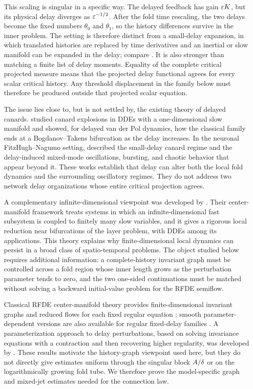 This scaling is singular in a specific way.  The delayed feedback has gain
\(\varepsilon K\), but its physical delay diverges as
\(\varepsilon^{-1/2}\).  After the fold time rescaling, the two delays become the
fixed numbers \(\theta_0\) and \(\theta_1\), so the history differences
survive in the inner problem.  The setting is therefore distinct from a
small-delay expansion, in which translated histories are replaced by time
derivatives and an inertial or slow manifold can be expanded in the delay;
compare \citet{chicone2003inertial}.  It is also stronger than matching a
finite list of delay moments.  Equality of the complete critical projected
measure means that the projected delay functional agrees for every scalar
critical history.  Any threshold displacement in the family below must
therefore be produced outside that projected scalar equation.

The issue lies close to, but is not settled by, the existing theory of
delayed canards.  \citet{krupa2016explosion} studied canard explosions in DDEs
with a one-dimensional slow manifold and showed, for delayed van der Pol
dynamics, how the classical family ends at a Bogdanov--Takens bifurcation as
the delay increases.  In the neuronal FitzHugh--Nagumo setting,
\citet{krupa2016complex} described the small-delay canard regime and the
delay-induced mixed-mode oscillations, bursting, and chaotic behavior that
appear beyond it.  These works establish that delay can alter both the local
fold dynamics and the surrounding oscillatory regimes.  They do not address
two network delay organizations whose entire critical projection agrees.

A complementary infinite-dimensional viewpoint was developed by
\citet{avitabile2020local}.  Their center-manifold framework treats systems
in which an infinite-dimensional fast subsystem is coupled to finitely many
slow variables, and it gives a rigorous local reduction near bifurcations of
the layer problem, with DDEs among its applications.  This theory explains
why finite-dimensional local dynamics can persist in a broad class of
spatio-temporal problems.  The object studied below requires additional
information: a complete-history invariant graph must be controlled across a
fold region whose inner length grows as the perturbation parameter tends to
zero, and the two one-sided continuations must be matched without solving a
backward initial-value problem for the RFDE semiflow.

Classical RFDE center-manifold theory provides finite-dimensional invariant
graphs and reduced flows for each fixed regular equation
\citep{diekmannvangils1991center}; smooth parameter-dependent versions are
also available for regular fixed-delay families
\citep{bosschaert2020switching}.  A parameterization approach to delay
perturbations, based on solving invariance equations with a contraction and
then recovering higher regularity, was developed by
\citet{yang2021parameterization}.  These results motivate the history-graph
viewpoint used here, but they do not directly give estimates uniform through
the singular block \(A/\delta\) or on the logarithmically growing fold tube.
We therefore prove the model-specific graph and mixed-jet estimates needed
for the connection law.

